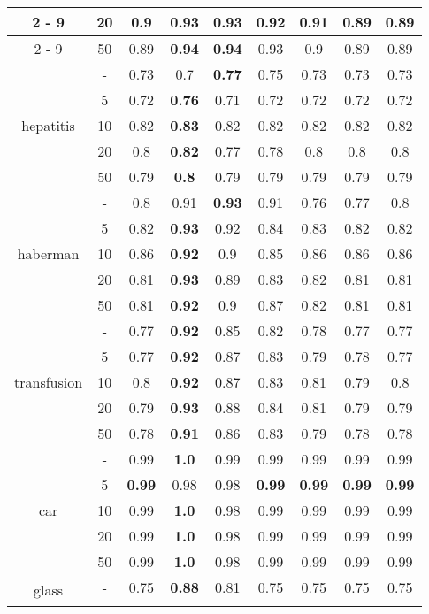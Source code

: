 \documentclass{article}%
\begin{document}
\begin{tabular}{c|c|ccccccc}
\cline{2%
-%
9}%
&20&0.9&\textbf{0.93}&\textbf{0.93}&0.92&0.91&0.89&0.89\\%
\cline{2%
-%
9}%
&50&0.89&\textbf{0.94}&\textbf{0.94}&0.93&0.9&0.89&0.89\\%
\hline%
\multirow{5}{*}{hepatitis}&{-}&0.73&0.7&\textbf{0.77}&0.75&0.73&0.73&0.73\\%
\cline{2%
-%
9}%
&5&0.72&\textbf{0.76}&0.71&0.72&0.72&0.72&0.72\\%
\cline{2%
-%
9}%
&10&0.82&\textbf{0.83}&0.82&0.82&0.82&0.82&0.82\\%
\cline{2%
-%
9}%
&20&0.8&\textbf{0.82}&0.77&0.78&0.8&0.8&0.8\\%
\cline{2%
-%
9}%
&50&0.79&\textbf{0.8}&0.79&0.79&0.79&0.79&0.79\\%
\hline%
\multirow{5}{*}{haberman}&{-}&0.8&0.91&\textbf{0.93}&0.91&0.76&0.77&0.8\\%
\cline{2%
-%
9}%
&5&0.82&\textbf{0.93}&0.92&0.84&0.83&0.82&0.82\\%
\cline{2%
-%
9}%
&10&0.86&\textbf{0.92}&0.9&0.85&0.86&0.86&0.86\\%
\cline{2%
-%
9}%
&20&0.81&\textbf{0.93}&0.89&0.83&0.82&0.81&0.81\\%
\cline{2%
-%
9}%
&50&0.81&\textbf{0.92}&0.9&0.87&0.82&0.81&0.81\\%
\hline%
\multirow{5}{*}{transfusion}&{-}&0.77&\textbf{0.92}&0.85&0.82&0.78&0.77&0.77\\%
\cline{2%
-%
9}%
&5&0.77&\textbf{0.92}&0.87&0.83&0.79&0.78&0.77\\%
\cline{2%
-%
9}%
&10&0.8&\textbf{0.92}&0.87&0.83&0.81&0.79&0.8\\%
\cline{2%
-%
9}%
&20&0.79&\textbf{0.93}&0.88&0.84&0.81&0.79&0.79\\%
\cline{2%
-%
9}%
&50&0.78&\textbf{0.91}&0.86&0.83&0.79&0.78&0.78\\%
\hline%
\multirow{5}{*}{car}&{-}&0.99&\textbf{1.0}&0.99&0.99&0.99&0.99&0.99\\%
\cline{2%
-%
9}%
&5&\textbf{0.99}&0.98&0.98&\textbf{0.99}&\textbf{0.99}&\textbf{0.99}&\textbf{0.99}\\%
\cline{2%
-%
9}%
&10&0.99&\textbf{1.0}&0.98&0.99&0.99&0.99&0.99\\%
\cline{2%
-%
9}%
&20&0.99&\textbf{1.0}&0.98&0.99&0.99&0.99&0.99\\%
\cline{2%
-%
9}%
&50&0.99&\textbf{1.0}&0.98&0.99&0.99&0.99&0.99\\%
\hline%
\multirow{5}{*}{glass}&{-}&0.75&\textbf{0.88}&0.81&0.75&0.75&0.75&0.75\\%
\cline{2%
}
\end{tabular}
\end{document}
